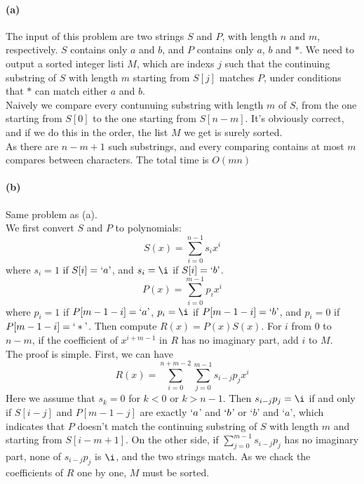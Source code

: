 \documentclass{6046}
\author{Lingfu Zhang}
\begin{document}
\paragraph{(a)}
The input of this problem are two strings 
$S$ and $P$, with length $n$ and $m$, respectively.  
$S$ contains only $a$ and $b$, 
and $P$ contains only $a$, $b$ and $*$. 
We need to output a sorted integer listi $M$,  
which are indexs $j$ such that 
the continuing substring of $S$ 
with length $m$
starting from $S[j]$ 
matches $P$, 
under conditions that $*$ can match either $a$ and $b$. 
\\

Naively we compare every contunuing substring with length $m$ of $S$, 
from the one starting from $S[0]$ to the one starting from $S[n-m]$. 
It's obviously correct, and if we do this in the order, 
the list $M$ we get is surely sorted. 
\\

As there are $n-m+1$ such substrings, and every comparing 
contains at most $m$ compares between characters. 
The total time is $O(mn)$

\paragraph{(b)}
Same problem as (a). 
\\

We first convert $S$ and $P$ to polynomials: 
$$S(x) = \sum\limits_{i=0}^{n-1} s_ix^i$$
where $s_i = 1$ if $S[i] = ` a\textrm'$, 
and $s_i = \i$ if $S[i] = `b\textrm'$. 
$$P(x) = \sum\limits_{i=0}^{m-1} p_ix^i$$
where $p_i = 1$ if $P[m-1-i] = `a\textrm'$, 
$p_i = \i$ if $P[m-1-i] = `b\textrm'$, 
and $p_i = 0$ if $P[m-1-i] = `*\textrm'$. 
Then compute $R(x) = P(x)S(x)$. 
For $i$ from $0$ to $n-m$, 
if the coefficient of $x^{i+m-1}$ in $R$ has no imaginary part, 
add $i$ to $M$. 
\\

The proof is simple. 
First, we can have 
$$R(x) = \sum\limits_{i=0}^{n+m-2}\sum\limits_{j=0}^{m-1}s_{i-j}p_jx^{i}$$
Here we assume that $s_{k} = 0$ for $k<0$ or $k>n-1$. 
Then 
$s_{i-j}p_j = \i$
if and only if 
$S[i-j]$ and $P[m-1-j]$ are exactly $`a$' and $`b$' or `$b$' and `$a$', 
which indicates that 
$P$ doesn't match the continuing substring of $S$ 
with length $m$ and starting from $S[i-m+1]$. 
On the other side, 
if 
$\displaystyle{\sum\limits_{j=0}^{m-1}s_{i-j}p_j}$ has no imaginary part, 
none of 
$s_{i-j}p_j$ 
is $\i$, and the two strings match. 
As we chack the coefficients of $R$ one by one, 
$M$ must be sorted. 
\\
\end{document}
